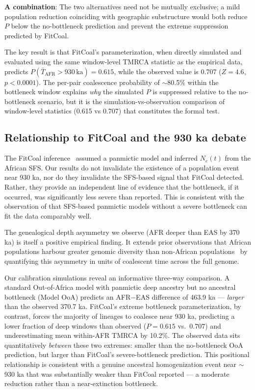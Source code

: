 \textbf{A combination}: The two alternatives need not be mutually exclusive; a mild population reduction coinciding with geographic substructure would both reduce $P$ below the no-bottleneck prediction and prevent the extreme suppression predicted by FitCoal.

The key result is that FitCoal's parameterization, when directly simulated and evaluated using the same window-level TMRCA statistic as the empirical data, predicts $P(\bar{T}_\text{AFR} > 930\,\text{ka}) = 0.615$, while the observed value is 0.707 ($Z = 4.6$, $p < 0.0001$). The per-pair coalescence probability of $\sim$80.5\% within the bottleneck window explains \textit{why} the simulated $P$ is suppressed relative to the no-bottleneck scenario, but it is the simulation-vs-observation comparison of window-level statistics (0.615 vs 0.707) that constitutes the formal test.

\subsection*{Relationship to FitCoal and the 930 ka debate}

The FitCoal inference~\citep{Hu2023} assumed a panmictic model and inferred $N_e(t)$ from the African SFS. Our results do not invalidate the existence of a population event near 930 ka, nor do they invalidate the SFS-based signal that FitCoal detected. Rather, they provide an independent line of evidence that the bottleneck, if it occurred, was significantly less severe than reported. This is consistent with the observation of \citet{Cousins2025b} that SFS-based panmictic models without a severe bottleneck can fit the data comparably well.

The genealogical depth asymmetry we observe (AFR deeper than EAS by 370 ka) is itself a positive empirical finding. It extends prior observations that African populations harbour greater genomic diversity than non-African populations~\citep{Prugnolle2005,DeGiorgio2009} by quantifying this asymmetry in units of coalescent time across the full genome.

Our calibration simulations reveal an informative three-way comparison. A standard Out-of-Africa model with panmictic deep ancestry but no ancestral bottleneck (Model OoA) predicts an AFR$-$EAS difference of 463.9 ka --- \emph{larger} than the observed 370.7 ka. FitCoal's extreme bottleneck parameterization, by contrast, forces the majority of lineages to coalesce near 930 ka, predicting a lower fraction of deep windows than observed ($P = 0.615$ vs.\ $0.707$) and underestimating mean within-AFR TMRCA by 10.2\%. The observed data sits quantitatively \emph{between} these two extremes: smaller than the no-bottleneck OoA prediction, but larger than FitCoal's severe-bottleneck prediction. This positional relationship is consistent with a genuine ancestral homogenization event near $\sim$930 ka that was substantially weaker than FitCoal reported --- a moderate reduction rather than a near-extinction bottleneck.

